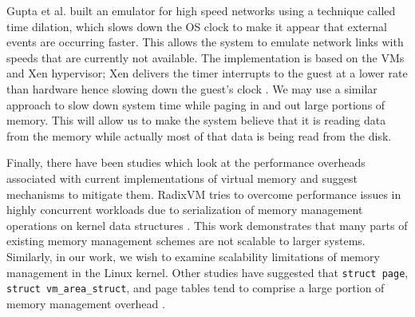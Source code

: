 \documentclass[twocolumn,11pt]{article}
\begin{document}
Gupta et al. built an emulator for high speed networks using a technique called
time dilation, which slows down the OS clock to make it appear that external
events are occurring faster. This allows the system to emulate network links
with speeds that are currently not available. The implementation is based on the
VMs and Xen hypervisor; Xen delivers the timer interrupts to the guest at a
lower rate than hardware hence  slowing down the guest’s clock \cite{timedil}.
We may use a similar approach to slow down system time  while paging in and out
large portions of memory. This will allow us to make the system believe that it
is reading data from the memory while actually most of that data is being read
from the disk.

Finally, there have been studies which look at the performance overheads
associated with current implementations of virtual memory and suggest mechanisms
to mitigate them. RadixVM tries to overcome performance issues in highly
concurrent workloads due to serialization of memory management operations on
kernel data structures \cite{radixvm}. This work demonstrates that many parts of
existing memory management schemes are not scalable to larger systems.
Similarly, in our work, we wish to examine scalability limitations of memory
management in the Linux kernel. Other studies have suggested that \texttt{struct
page}, \texttt{struct vm\_area\_struct}, and page tables tend to comprise a
large portion of memory management overhead \cite{simics}.

{}

\end{document}
